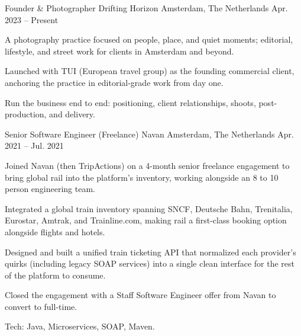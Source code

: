 \begin{cventries}
  \cventry
    {Founder \& Photographer} %
    {Drifting Horizon} %
    {Amsterdam, The Netherlands} %
    {Apr. 2023 -- Present} %
    {
      \begin{cvitems} %
        \item {A photography practice focused on people, place, and quiet moments; editorial, lifestyle, and street work for clients in Amsterdam and beyond.}
        \item {Launched with TUI (European travel group) as the founding commercial client, anchoring the practice in editorial-grade work from day one.}
        \item {Run the business end to end: positioning, client relationships, shoots, post-production, and delivery.}
      \end{cvitems}
    }

  \cventry
    {Senior Software Engineer (Freelance)} %
    {Navan} %
    {Amsterdam, The Netherlands} %
    {Apr. 2021 -- Jul. 2021} %
    {
      \begin{cvitems} %
        \item {Joined Navan (then TripActions) on a 4-month senior freelance engagement to bring global rail into the platform's inventory, working alongside an 8 to 10 person engineering team.}
        \item {Integrated a global train inventory spanning SNCF, Deutsche Bahn, Trenitalia, Eurostar, Amtrak, and Trainline.com, making rail a first-class booking option alongside flights and hotels.}
        \item {Designed and built a unified train ticketing API that normalized each provider's quirks (including legacy SOAP services) into a single clean interface for the rest of the platform to consume.}
        \item {Closed the engagement with a Staff Software Engineer offer from Navan to convert to full-time.}
        \item {Tech: Java, Microservices, SOAP, Maven.}
      \end{cvitems}
    }


\end{cventries}
